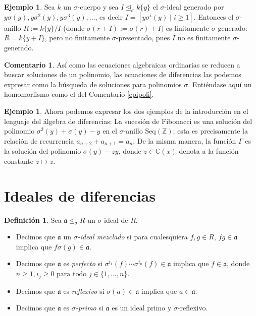 \documentclass[letterpaper]{article}
\def\Z{\mathbb{Z}}
\def\C{\mathbb{C}}
\def\fa{\text{ para todo }}
\def\a{\mathfrak{a}}
\def\s{\sigma}
\def\si{\unlhd_{\sigma}}
\theoremstyle{definition}
\newtheorem{ex}[Satz]{Ejemplo}
\newtheorem{rem}[Satz]{Comentario}
\newtheorem{defn}[Satz]{Definici\'on}
\begin{document}
\begin{ex}
Sea $k$ un $\sigma$-cuerpo y sea $I \si k\{y\} $ el $\sigma$-ideal generado por $y\s(y), y\s^2(y), y\s^3(y), \ldots$, es decir $I = [y \s^i(y) \mid i\geq 1]$. Entonces el $\sigma$-anillo $R := k\{y\}/I$ (donde $\s (r + I) := \s(r) + I)$ es 
finitamente $\sigma$-generado: $R = k\{ y + I \}$, pero no finitamente $\sigma$-presentado, pues $I$ no es finitamente $\sigma$-generado.
\end{ex}

\begin{rem}
As\'i como las ecuaciones algebraicas ordinarias se reducen a buscar soluciones de un polinomio, 
las ecuaciones de diferencias las podemos expresar como la b\'usqueda de soluciones para  polinomios $\sigma$. Enti\'endase aqu\'i un homomorfismo como el del Comentario \ref{epipoli}.
\end{rem}

\begin{ex}
Ahora podemos expresar los dos ejemplos de la introducci\'on en el lenguaje del \'algebra de diferencias:
La sucesi\'on de Fibonacci es una soluci\'on del polinomio $\sigma^2(y) + \sigma(y) - y$ en el $\sigma$-anillo  $\text{Seq}(\Z)$; esta es precisamente la relaci\'on de recurrencia $a_{n+2} + a_{n+1} = a_n$.
De la misma manera, la funci\'on $\Gamma$ es la soluci\'on del polinomio $\sigma(y) - zy$, donde $z \in \C(x)$ denota a la funci\'on constante $z \mapsto z$.
\end{ex}

\section{Ideales de diferencias}

\begin{defn}
Sea  $\a \si R$ un $\sigma$-ideal de $R$. 
\begin{itemize}
\item Decimos que  $\a$ un $\sigma$\emph{-ideal mezclado} si para cualesquiera $f,g \in R$, $fg \in \a$ implica que $f \sigma(g) \in \a$.
\item Decimos que $\a$ es \emph{perfecto} si $\sigma^{i_1}(f) \cdots \sigma^{i_n}(f) \in \a$ implica que $f \in \a$, donde $n \geq 1, i_j \geq 0 \fa j \in \{1,\ldots,n\}$.
\item Decimos que $\a$ es \emph{reflexivo} si $\s(a) \in \a$ implica que $a \in \a$.
\item Decimos que $\a$ es $\s$\emph{-primo} si $\a$ es un ideal primo y $\sigma$-reflexivo.
\end{itemize}
\end{defn}
\end{document}
